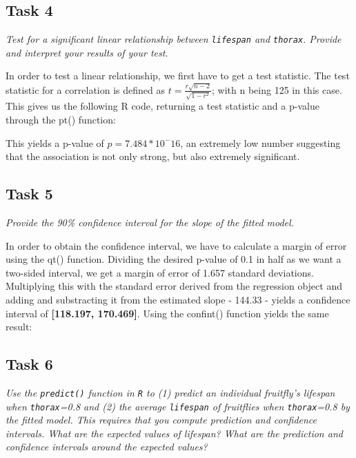 \documentclass[12pt,a4paper]{article}
\begin{document}
\subsection*{Task 4}
\textit{Test for a significant linear relationship between  \texttt{lifespan} and \texttt{thorax}. Provide and interpret your results of your test.}

In order to test a linear relationship, we first have to get a test statistic. The test statistic for a correlation is defined as $t = \frac{r\sqrt{n-2}}{\sqrt{1-r^2}}$; with n being 125 in this case. This gives us the following R code, returning a test statistic and a p-value through the pt() function:



This yields a p-value of $p = 7.484*10^-16$, an extremely low number suggesting that the association is not only strong, but also extremely significant.

\subsection*{Task 5}
\textit{Provide the 90\% confidence interval for the slope of the fitted model.}



In order to obtain the confidence interval, we have to calculate a margin of error using the qt() function. Dividing the desired p-value of 0.1 in half as we want a two-sided interval, we get a margin of error of 1.657 standard deviations. Multiplying this with the standard error derived from the regression object and adding and substracting it from the estimated slope - 144.33 - yields a confidence interval of \textbf{[118.197, 170.469]}. Using the confint() function yields the same result:



\subsection*{Task 6}
\textit{Use the \texttt{predict()} function in \texttt{R} to (1) predict an individual fruitfly's lifespan when \texttt{thorax}=0.8 and (2) the average \texttt{lifespan} of fruitflies when \texttt{thorax}=0.8 by the fitted model. This requires that you compute prediction and confidence intervals. What are the expected values of lifespan? What are the prediction and confidence intervals around the expected values?}
\end{document}
